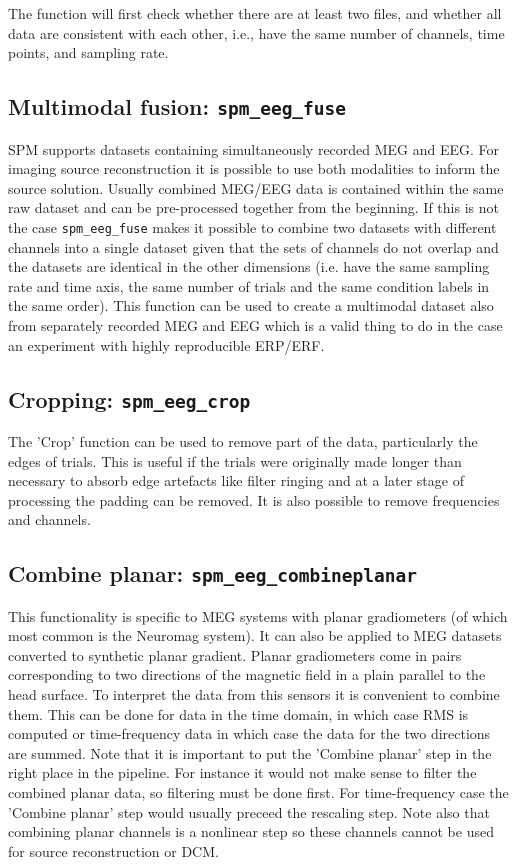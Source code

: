 The function will first check whether there are at least two files, and whether all data are consistent with each other, i.e., have the same number of channels, time points, and sampling rate. 

\subsection{Multimodal fusion: \texttt{spm\_eeg\_fuse}}
SPM supports datasets containing simultaneously recorded MEG and EEG. For imaging source reconstruction it is possible to use both modalities to inform the source solution. Usually combined MEG/EEG data is contained within the same raw dataset and can be pre-processed together from the beginning. If this is not the case \texttt{spm\_eeg\_fuse} makes it possible to combine two datasets with different channels into a single dataset given that the sets of channels do not overlap and the datasets are identical in the other dimensions (i.e. have the same sampling rate and time axis, the same number of trials and the same condition labels in the same order). This function can be used to create a multimodal dataset also from separately recorded MEG and EEG which is a valid thing to do in the case an experiment with highly reproducible ERP/ERF.

\subsection{Cropping: \texttt{spm\_eeg\_crop}}
The 'Crop' function can be used to remove part of the data, particularly the edges of trials. This is useful if the trials were originally made longer than necessary to absorb edge artefacts like filter ringing and at a later stage of processing the padding can be removed.  It is also possible to remove frequencies and channels.

\subsection{Combine planar: \texttt{spm\_eeg\_combineplanar}}
This functionality is specific to MEG systems with planar gradiometers (of which most common is the Neuromag system). It can also be applied to MEG datasets converted to synthetic planar gradient. Planar gradiometers come in pairs corresponding to two directions of the magnetic field in a plain parallel to the head surface. To interpret the data from this sensors it is convenient to combine them. This can be done for data in the time domain, in which case RMS is computed or time-frequency data in which case the data for the two directions are summed. Note that it is important to put the 'Combine planar' step in the right place in the pipeline. For instance it would not make sense to filter the combined planar data, so filtering must be done first. For time-frequency case the 'Combine planar' step would usually preceed the rescaling step. Note also that combining planar channels is a nonlinear step so these channels cannot be used for source reconstruction or DCM.

